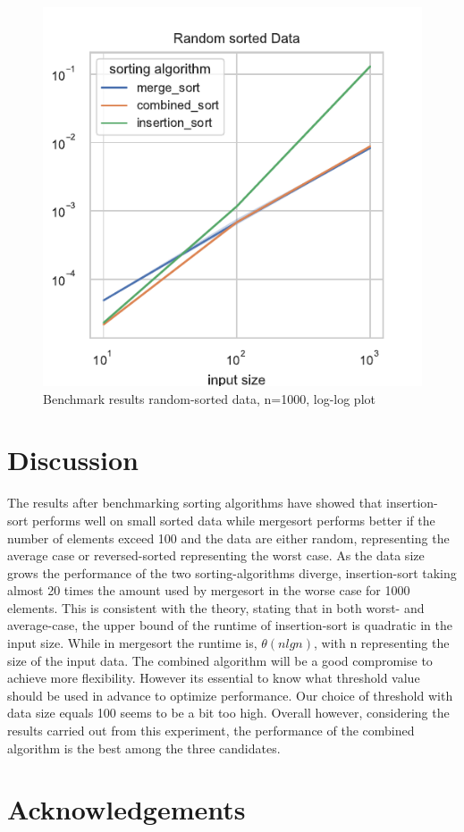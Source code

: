 \documentclass[sigconf, nonacm, natbib, screen, balance=False]{acmart}
\begin{document}
\begin{figure}
  \centering
  \includegraphics[width=0.8\columnwidth]{random_plot1000.pdf}
  \caption{Benchmark results random-sorted data, n=1000, log-log plot}
  \label{fig:bench}
\end{figure}


\section{Discussion}\label{sec:discussion}
The results after benchmarking sorting algorithms have showed that insertion-sort performs well on small sorted data while mergesort performs better if the number of elements exceed 100 and the data are either random, representing the average case or reversed-sorted representing the worst case. As the data size grows the performance of the two sorting-algorithms diverge, insertion-sort taking almost 20 times the amount used by mergesort in the worse case for 1000 elements. This is consistent with the theory, stating that in both worst- and average-case, the upper bound of the runtime of insertion-sort is quadratic in the input size. While in mergesort the runtime is, $ \theta (n lgn)$, with n representing the size of the input data. The combined algorithm will be a good compromise to achieve more flexibility. However its essential to know what threshold value should be used in advance to optimize performance. Our choice of threshold with data size equals 100 seems to be a bit too high. Overall however, considering the results carried out from this experiment, the performance of the combined algorithm is the best among the three candidates.





\section{Acknowledgements}\label{sec:acknowledgements}




\end{document}
